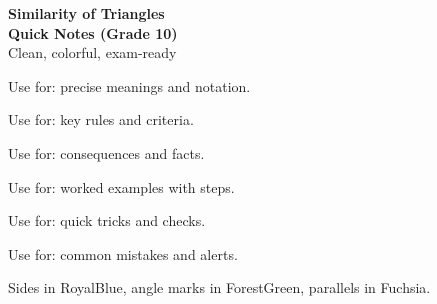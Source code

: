 \documentclass[11pt,a4paper]{article}
\begin{document}
\begin{titlepage}
  \centering
  \vspace*{2.5cm}
  {\Huge \bfseries Similarity of Triangles\\[6pt] \Large Quick Notes (Grade 10)}\\[1.2cm]
  {\large Clean, colorful, exam-ready}\par
  \vfill

  \begin{minipage}{0.9\textwidth}
    \begin{multicols}{2}
      \begin{definitionbox}
        Use for: precise meanings and notation.
      \end{definitionbox}
      \begin{theorembox}
        Use for: key rules and criteria.
      \end{theorembox}
      \begin{propertybox}
        Use for: consequences and facts.
      \end{propertybox}
      \begin{examplebox}
        Use for: worked examples with steps.
      \end{examplebox}
      \begin{shortcutbox}
        Use for: quick tricks and checks.
      \end{shortcutbox}
      \begin{warningbox}
        Use for: common mistakes and alerts.
      \end{warningbox}
    \end{multicols}
  \end{minipage}

  \vfill
  {\small Sides in RoyalBlue, angle marks in ForestGreen, parallels in Fuchsia.}\par
  \vspace*{1cm}
  {\small \textcopyright\ \the\year}\par
  \thispagestyle{empty}
\end{titlepage}

\setcounter{page}{1}

\end{document}
